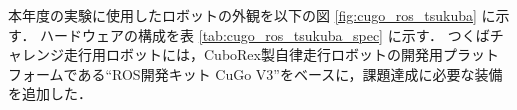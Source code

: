 \documentclass[platex,dvipdfmx]{rbproceedings}
\begin{document}
%
%
%



本年度の実験に使用したロボットの外観を以下の図 \ref{fig:cugo_ros_tsukuba} に示す．
ハードウェアの構成を表 \ref{tab:cugo_ros_tsukuba_spec} に示す．
つくばチャレンジ走行用ロボットには，CuboRex製自律走行ロボットの開発用プラットフォームである“ROS開発キット CuGo V3”をベースに，課題達成に必要な装備を追加した．
\end{document}
